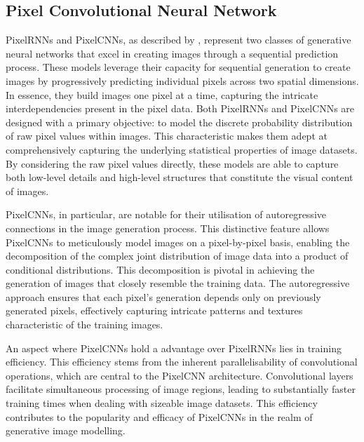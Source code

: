 \subsection{Pixel Convolutional Neural Network}
\label{subsec:pixelcnn}
PixelRNNs and PixelCNNs, as described by \cite{oord2016pixel}, represent two classes of generative neural networks that excel in creating images through a sequential prediction process. These models leverage their capacity for sequential generation to create images by progressively predicting individual pixels across two spatial dimensions. In essence, they build images one pixel at a time, capturing the intricate interdependencies present in the pixel data. Both PixelRNNs and PixelCNNs are designed with a primary objective: to model the discrete probability distribution of raw pixel values within images. This characteristic makes them adept at comprehensively capturing the underlying statistical properties of image datasets. By considering the raw pixel values directly, these models are able to capture both low-level details and high-level structures that constitute the visual content of images.

PixelCNNs, in particular, are notable for their utilisation of autoregressive connections in the image generation process. This distinctive feature allows PixelCNNs to meticulously model images on a pixel-by-pixel basis, enabling the decomposition of the complex joint distribution of image data into a product of conditional distributions. This decomposition is pivotal in achieving the generation of images that closely resemble the training data. The autoregressive approach ensures that each pixel's generation depends only on previously generated pixels, effectively capturing intricate patterns and textures characteristic of the training images.

An aspect where PixelCNNs hold a advantage over PixelRNNs lies in training efficiency. This efficiency stems from the inherent parallelisability of convolutional operations, which are central to the PixelCNN architecture. Convolutional layers facilitate simultaneous processing of image regions, leading to substantially faster training times when dealing with sizeable image datasets. This efficiency contributes to the popularity and efficacy of PixelCNNs in the realm of generative image modelling.



